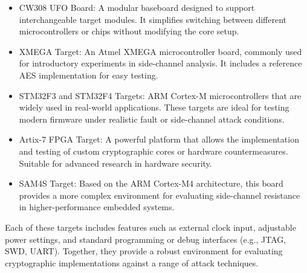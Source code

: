 \begin{itemize}
    \item CW308 UFO Board: A modular baseboard \cite{newae_cw308ufo} designed to support interchangeable target modules. It simplifies switching between different microcontrollers or chips without modifying the core setup.
    
    \item XMEGA Target: An Atmel XMEGA microcontroller board, commonly used for introductory experiments in side-channel analysis. It includes a reference AES implementation for easy testing.
    
    \item STM32F3 and STM32F4 Targets: ARM Cortex-M microcontrollers that are widely used in real-world applications. These targets are ideal for testing modern firmware under realistic fault or side-channel attack conditions.
    
    \item Artix-7 FPGA Target: A powerful platform \cite{newae_cw305} that allows the implementation and testing of custom cryptographic cores or hardware countermeasures. Suitable for advanced research in hardware security.
    
    \item SAM4S Target: Based on the ARM Cortex-M4 architecture, this board provides a more complex environment for evaluating side-channel resistance in higher-performance embedded systems.
\end{itemize}

Each of these targets includes features such as external clock input, adjustable power settings, and standard programming or debug interfaces (e.g., JTAG, SWD, UART). Together, they provide a robust environment for evaluating cryptographic implementations against a range of attack techniques.



